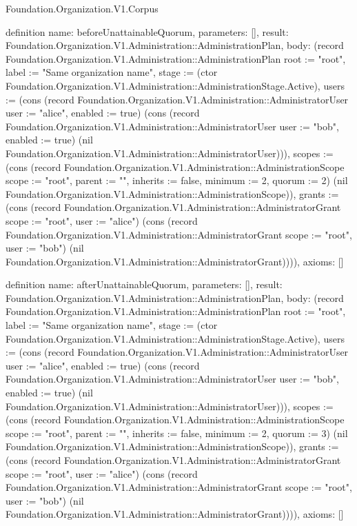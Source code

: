 \begin{lexlean}{Foundation.Organization.V1.Corpus}
\begin{semanticmodule}
definition{
  name: beforeUnattainableQuorum,
  parameters: [],
  result: Foundation.Organization.V1.Administration::AdministrationPlan,
  body: (record Foundation.Organization.V1.Administration::AdministrationPlan {root := "root", label := "Same organization name", stage := (ctor Foundation.Organization.V1.Administration::AdministrationStage.Active), users := (cons (record Foundation.Organization.V1.Administration::AdministratorUser {user := "alice", enabled := true}) (cons (record Foundation.Organization.V1.Administration::AdministratorUser {user := "bob", enabled := true}) (nil Foundation.Organization.V1.Administration::AdministratorUser))), scopes := (cons (record Foundation.Organization.V1.Administration::AdministrationScope {scope := "root", parent := "", inherits := false, minimum := 2, quorum := 2}) (nil Foundation.Organization.V1.Administration::AdministrationScope)), grants := (cons (record Foundation.Organization.V1.Administration::AdministratorGrant {scope := "root", user := "alice"}) (cons (record Foundation.Organization.V1.Administration::AdministratorGrant {scope := "root", user := "bob"}) (nil Foundation.Organization.V1.Administration::AdministratorGrant)))}),
  axioms: []
}

definition{
  name: afterUnattainableQuorum,
  parameters: [],
  result: Foundation.Organization.V1.Administration::AdministrationPlan,
  body: (record Foundation.Organization.V1.Administration::AdministrationPlan {root := "root", label := "Same organization name", stage := (ctor Foundation.Organization.V1.Administration::AdministrationStage.Active), users := (cons (record Foundation.Organization.V1.Administration::AdministratorUser {user := "alice", enabled := true}) (cons (record Foundation.Organization.V1.Administration::AdministratorUser {user := "bob", enabled := true}) (nil Foundation.Organization.V1.Administration::AdministratorUser))), scopes := (cons (record Foundation.Organization.V1.Administration::AdministrationScope {scope := "root", parent := "", inherits := false, minimum := 2, quorum := 3}) (nil Foundation.Organization.V1.Administration::AdministrationScope)), grants := (cons (record Foundation.Organization.V1.Administration::AdministratorGrant {scope := "root", user := "alice"}) (cons (record Foundation.Organization.V1.Administration::AdministratorGrant {scope := "root", user := "bob"}) (nil Foundation.Organization.V1.Administration::AdministratorGrant)))}),
  axioms: []
}


\end{semanticmodule}
\end{lexlean}
